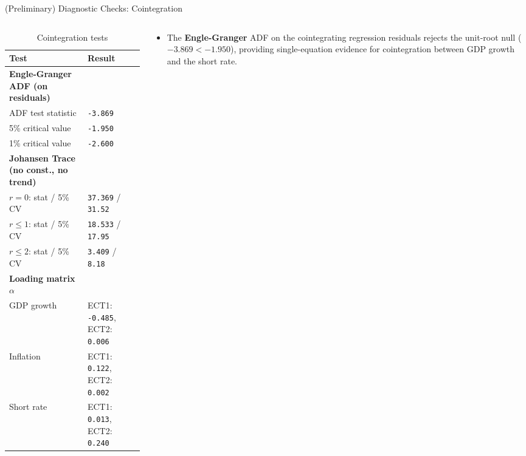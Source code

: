 \documentclass[9pt]{beamer}
\begin{document}
\begin{frame}{(Preliminary) Diagnostic Checks: Cointegration}
\footnotesize

\begin{columns}

  \begin{column}{0.5\textwidth}
    \begin{table}[ht]
    \tiny
    \centering
    \caption{\footnotesize Cointegration tests}
    \begin{tabular}{ll}
    \toprule
    \textbf{Test} & \textbf{Result} \\
    \midrule
    \textbf{Engle-Granger ADF (on residuals)} & \\
    ADF test statistic & \texttt{-3.869} \\
    5\% critical value & \texttt{-1.950} \\
    1\% critical value & \texttt{-2.600} \\
    \addlinespace
    \textbf{Johansen Trace (no const., no trend)} & \\
    $r = 0$: stat / 5\% CV & \texttt{37.369} / \texttt{31.52} \\
    $r \leq 1$: stat / 5\% CV & \texttt{18.533} / \texttt{17.95} \\
    $r \leq 2$: stat / 5\% CV & \texttt{3.409} / \texttt{8.18} \\
    \addlinespace
    \textbf{Loading matrix $\alpha$} & \\
    GDP growth & ECT1: \texttt{-0.485}, ECT2: \texttt{0.006} \\
    Inflation   & ECT1: \texttt{0.122}, ECT2: \texttt{0.002} \\
    Short rate  & ECT1: \texttt{0.013}, ECT2: \texttt{0.240} \\
    \bottomrule
    \end{tabular}
    \end{table}
  \end{column}

  \begin{column}{0.5\textwidth}
    \footnotesize
    \begin{itemize}
      \item The \textbf{Engle-Granger} ADF on the cointegrating regression residuals rejects the unit-root null ($-3.869 < -1.950$), providing single-equation evidence for cointegration between GDP growth and the short rate.


\end{itemize}
\end{column}
\end{columns}
\end{frame}
\end{document}
